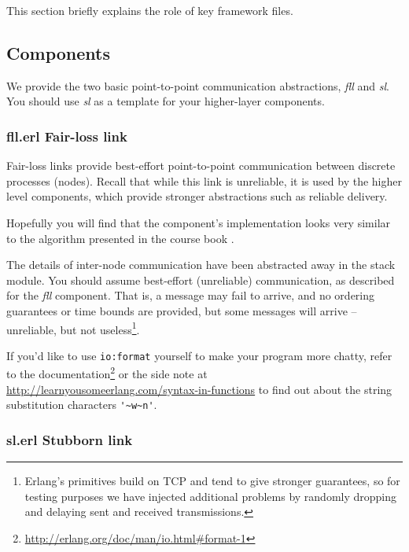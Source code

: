 \documentclass[a4paper]{article}
\begin{document}
This section briefly explains the role of key framework files.

\subsection{Components} %
\label{sub:components}

We provide the two basic point-to-point communication abstractions,
\emph{fll} and \emph{sl}. You should use \emph{sl} as a template for your
higher-layer components.

\subsubsection{fll.erl Fair-loss link} %
\label{ssub:fll_erl}

Fair-loss links provide best-effort point-to-point communication between
discrete processes (nodes). Recall that while this link is unreliable, it is
used by the higher level components, which provide stronger abstractions such
as reliable delivery.

Hopefully you will find that the component's implementation looks very
similar to the algorithm presented in the course book \cite{cachin2011}.

The details of inter-node communication have been abstracted away in the stack
module. You should assume best-effort (unreliable) communication, as described
for the \emph{fll} component. That is, a message may fail to arrive, and no ordering
guarantees or time bounds are provided, but some messages will arrive --
unreliable, but not useless\footnote{Erlang's primitives build on TCP and tend
to give stronger guarantees, so for testing purposes we have injected
additional problems by randomly dropping and delaying sent and received
transmissions.}.

If you'd like to use \lstinline!io:format! yourself to make your program more
chatty, refer to the
documentation\footnote{\url{http://erlang.org/doc/man/io.html\#format-1}} or
the side note at \url{http://learnyousomeerlang.com/syntax-in-functions} to
find out about the string substitution characters \lstinline!'~w~n'!.


\subsubsection{sl.erl Stubborn link} %
\label{ssub:sl_erl_stubborn_link}
\end{document}
